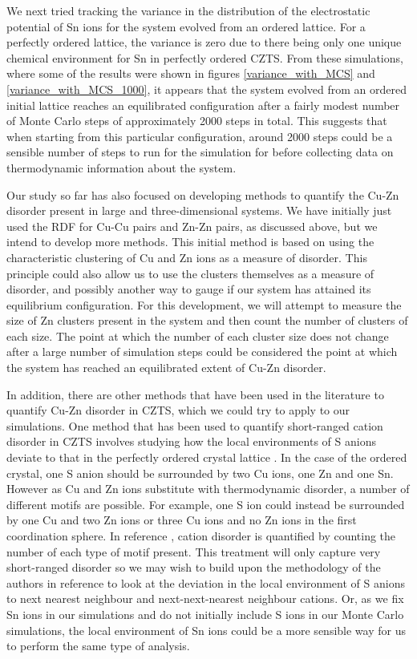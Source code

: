 We next tried tracking the variance in the distribution of the electrostatic potential of Sn ions for the system evolved from an ordered lattice. For a perfectly ordered lattice, the variance is zero due to there being only one unique chemical environment for Sn in perfectly ordered CZTS. From these simulations, where some of the results were shown in figures \ref{variance_with_MCS} and \ref{variance_with_MCS_1000}, it appears that the system evolved from an ordered initial lattice reaches an equilibrated configuration after a fairly modest number of Monte Carlo steps of approximately 2000 steps in total. This suggests that when starting from this particular configuration, around 2000 steps could be a sensible number of steps to run for the simulation for before collecting data on thermodynamic information about the system.

Our study so far has also focused on developing methods to quantify the Cu-Zn disorder present in large and three-dimensional systems. We have initially just used the RDF for Cu-Cu pairs and Zn-Zn pairs, as discussed above, but we intend to develop more methods. This initial method is based on using the characteristic clustering of Cu and Zn ions as a measure of disorder. This principle could also allow us to use the clusters themselves as a measure of disorder, and possibly another way to gauge if our system has attained its equilibrium configuration. For this development, we will attempt to measure the size of Zn clusters present in the system and then count the number of clusters of each size. The point at which the number of each cluster size does not change after a large number of simulation steps could be considered the point at which the system has reached an equilibrated extent of Cu-Zn disorder.

In addition, there are other methods that have been used in the literature to quantify Cu-Zn disorder in CZTS, which we could try to apply to our simulations. One method that has been used to quantify short-ranged cation disorder in CZTS involves studying how the local environments of S anions deviate to that in the perfectly ordered crystal lattice \cite{Lany_CZTS}. In the case of the ordered crystal, one S anion should be surrounded by two Cu ions, one Zn and one Sn. However as Cu and Zn ions substitute with thermodynamic disorder, a number of different motifs are possible. For example, one S ion could instead be surrounded by one Cu and two Zn ions or three Cu ions and no Zn ions in the first coordination sphere. In reference , cation disorder is quantified by counting the number of each type of motif present.
This treatment will only capture very short-ranged disorder so we may wish to build upon the methodology of the authors in reference  to look at the deviation in the local environment of S anions to next nearest neighbour and next-next-nearest neighbour cations. Or, as we fix Sn ions in our simulations and do not initially include S ions in our Monte Carlo simulations, the local environment of Sn ions could be a more sensible way for us to perform the same type of analysis.

